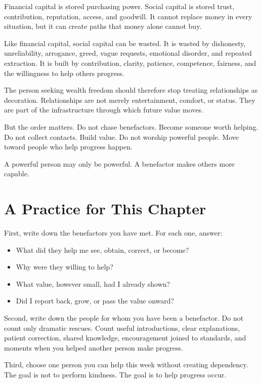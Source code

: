 Financial capital is stored purchasing power. Social capital is stored trust, contribution, reputation, access, and goodwill. It cannot replace money in every situation, but it can create paths that money alone cannot buy.

Like financial capital, social capital can be wasted. It is wasted by dishonesty, unreliability, arrogance, greed, vague requests, emotional disorder, and repeated extraction. It is built by contribution, clarity, patience, competence, fairness, and the willingness to help others progress.

The person seeking wealth freedom should therefore stop treating relationships as decoration. Relationships are not merely entertainment, comfort, or status. They are part of the infrastructure through which future value moves.

But the order matters. Do not chase benefactors. Become someone worth helping. Do not collect contacts. Build value. Do not worship powerful people. Move toward people who help progress happen.

A powerful person may only be powerful. A benefactor makes others more capable.

\section*{A Practice for This Chapter}

First, write down the benefactors you have met. For each one, answer:

\begin{itemize}
\item What did they help me see, obtain, correct, or become?
\item Why were they willing to help?
\item What value, however small, had I already shown?
\item Did I report back, grow, or pass the value onward?
\end{itemize}

Second, write down the people for whom you have been a benefactor. Do not count only dramatic rescues. Count useful introductions, clear explanations, patient correction, shared knowledge, encouragement joined to standards, and moments when you helped another person make progress.

Third, choose one person you can help this week without creating dependency. The goal is not to perform kindness. The goal is to help progress occur.

